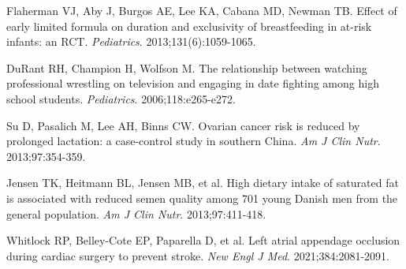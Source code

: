 \begin{references}
\item Flaherman VJ, Aby J, Burgos AE, Lee KA, Cabana MD, Newman TB. Effect of early limited formula on duration and exclusivity of breastfeeding in at-risk infants: an RCT. \textit{Pediatrics}. 2013;131(6):1059-1065.
\item DuRant RH, Champion H, Wolfson M. The relationship between watching professional wrestling on television and engaging in date fighting among high school students. \textit{Pediatrics}. 2006;118:e265-e272.
\item Su D, Pasalich M, Lee AH, Binns CW. Ovarian cancer risk is reduced by prolonged lactation: a case-control study in southern China. \textit{Am J Clin Nutr}. 2013;97:354-359.
\item Jensen TK, Heitmann BL, Jensen MB, et al. High dietary intake of saturated fat is associated with reduced semen quality among 701 young Danish men from the general population. \textit{Am J Clin Nutr}. 2013;97:411-418.
\item Whitlock RP, Belley-Cote EP, Paparella D, et al. Left atrial appendage occlusion during cardiac surgery to prevent stroke. \textit{New Engl J Med}. 2021;384:2081-2091.
\end{references}
